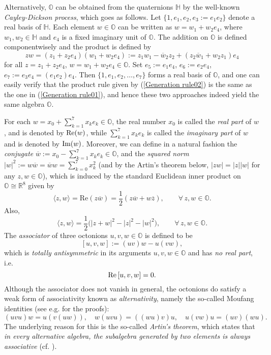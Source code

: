 \documentclass{amsart}
\theoremstyle{definition}
\theoremstyle{remark}
\numberwithin{equation}{section}
\begin{document}
Alternatively, $\mathbb O$ can be obtained from the quaternions $\mathbb H$ by the well-known \textit{Cayley-Dickson process}, which goes as follows. Let $\{1, e_1, e_2, e_3:=e_1e_2\}$ denote a real basis of $\mathbb H$. Each element $w\in\mathbb O$ can be written as $w=w_1+w_2e_4$, where $w_1, w_2\in\mathbb H$ and $e_4$ is a fixed imaginary unit of $\mathbb O$. The addition on $\mathbb O$ is defined componentwisely and the product is defined by
\begin{equation}\label{Generation rule02}
zw=(z_1+z_2e_4)(w_1+w_2e_4):=z_1w_1-\overline{w}_2z_2+(z_2\overline{w}_1+w_2z_1)e_4
\end{equation}
for all $z=z_1+z_2e_4$, $w=w_1+w_2e_4\in\mathbb O$. Set $e_5:=e_1e_4$, $e_6:=e_2e_4$, $e_7:=e_3e_4=(e_1e_2)e_4$. Then $\{1, e_1, e_2,\ldots, e_7\}$ forms a real basis of $\mathbb O$, and one can easily verify that the product rule given by (\ref{Generation rule02}) is the same as the one in (\ref{Generation rule01}), and hence these two approaches indeed yield the same algebra $\mathbb O$.

For each $w=x_0+\sum_{k=1}^7x_ke_k\in\mathbb O$, the real number $x_0$ is called the \textit{real part} of $w$, and is denoted by ${\rm{Re}}(w)$, while $\sum_{k=1}^7x_ke_k$ is called the \textit{imaginary part} of $w$  and is denoted by ${\rm{Im}}(w)$. Moreover, we can define in a natural fashion the \textit{conjugate} $\overline{w}:=x_0-\sum_{k=1}^7x_ke_k\in\mathbb O$, and the \textit{squared norm} $|w|^2:=w\overline{w}=\overline{w}w=\sum_{k=0}^7x_k^2$ (and by the Artin's theorem below, $|zw|=|z||w|$ for any $z,w\in\mathbb O$), which is induced by the standard Euclidean inner product on $\mathbb O\cong \mathbb R^8$ given by
\begin{equation}\label{inner product on O}
\langle z, w\rangle=\textrm{Re}(z\overline{w})=\frac12(z\overline{w}+w\overline{z}), \qquad \forall\, z,w\in\mathbb O.
\end{equation}
Also,
\begin{equation}\label{inner and norm on O}
\langle z, w\rangle=\frac12\big(|z+w|^2-|z|^2-|w|^2\big), \qquad \forall\, z,w\in\mathbb O.
\end{equation}
The \textit{associator} of three octonions $u, v, w\in\mathbb O$ is defined to be
$$[u, v, w]:=(uv)w-u(vw),$$
which is \textit{totally antisymmetric}
in its arguments $u, v, w\in\mathbb O$ and has \textit{no real part}, i.e.
\begin{equation}\label{Real part free}
{\rm{Re}}\,[u, v, w]=0.
\end{equation}
Although the associator does not vanish in
general, the octonions do satisfy a weak form of associativity known as \textit{alternativity},
namely the so-called Moufang identities (see e.g. \cite[p. 120]{Harvey} for the proofs):
\begin{equation}\label{Monfang}
(uvu)w=u(v(uw)),\quad w(uvu)=((wu)v)u, \quad u(vw)u=(uv)(wu).
\end{equation}
The underlying reason for this is the so-called \textit{Artin's theorem}, which states that \textit{in every alternative algebra, the subalgebra generated by two elements is always associative} (cf. \cite[p. 18]{Okubo}).
\end{document}

